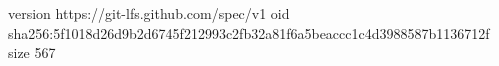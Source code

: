 version https://git-lfs.github.com/spec/v1
oid sha256:5f1018d26d9b2d6745f212993c2fb32a81f6a5beaccc1c4d3988587b1136712f
size 567
